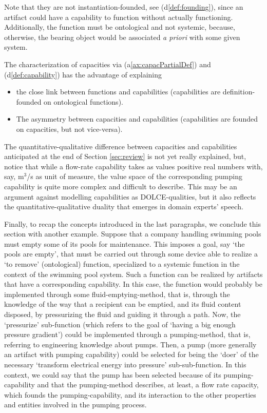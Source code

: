 \documentclass[sw]{iosart2x}
\newcommand{\AxLabel}{\textrm{a}}
\newcommand{\DefLabel}{\textrm{d}}
\newcommand{\refax}[1]{({\AxLabel}\ref{#1})}
\newcommand{\refdf}[1]{({\DefLabel}\ref{#1})}
\newcommand{\DOLCE}{\textsc{DOLCE}\xspace} %
\newcommand{\TODOinline}[1]{{%
}}
\newcommand{\myComment}[1]{{\unskip \ignorespaces}}
\begin{document}
Note that they are not instantiation-founded, see \refdf{def:founding}, since an artifact could have a capability to function without actually functioning. Additionally, the function must be ontological and not systemic, because, otherwise, the bearing object would be associated \textit{a priori} with some given system. 

The characterization of capacities via \refax{ax:capacPartialDef} and \refdf{def:capability} has the advantage of explaining
\begin{itemize}
    \item the close link between functions and capabilities (capabilities are definition-founded on ontological functions).
    \item The asymmetry between capacities and capabilities (capabilities are founded on capacities, but not vice-versa).
\end{itemize}
The quantitative-qualitative difference between capacities and capabilities anticipated at the end of Section \ref{sec:review} is not yet really explained, but, notice that while a flow-rate capability takes as values positive real numbers with, say, m$^3$/s as unit of measure, the value space of the corresponding pumping capability is quite more complex and difficult to describe. This  may be an argument against modelling capabilities as \DOLCE-qualities, but it also reflects the quantitative-qualitative duality that emerges in domain experts' speech. %

\medskip
Finally, to recap the concepts introduced in the last paragraphs, we conclude this section with another example.\myComment{\footnote{Notice again the similarity with the work of Kitamura, Sasajima, Mizoguchi et al.\cite{kitamuraOntologybasedDescriptionFunctional2003}.}} Suppose that a company handling swimming pools must empty some of its pools for maintenance. This imposes a goal, say `the pools are empty', that must be carried out through some device able to realize a `to remove' (ontological) function, specialized to a systemic function in the context of the swimming pool system.
Such a function can be realized by artifacts that have a corresponding capability. In this case, the function would probably be implemented through some fluid-emptying-method, that is, through the knowledge of the way that a recipient can be emptied, and its fluid content disposed, by pressurizing the fluid and guiding it through a path.
Now, the `pressurize' sub-function (which refers to the goal of `having a big enough pressure gradient') could be implemented through a pumping-method, that is, referring to engineering knowledge about pumps.
Then, a pump (more generally an artifact with pumping capability) could be selected for being the `doer' of the necessary `transform electrical energy into pressure' sub-sub-function.
In this context, we could say that the pump has been selected because of its pumping-capability and that the pumping-method describes, at least, a flow rate capacity, which founds the pumping-capability, and its interaction to the other properties and entities involved in the pumping process. 
\end{document}
